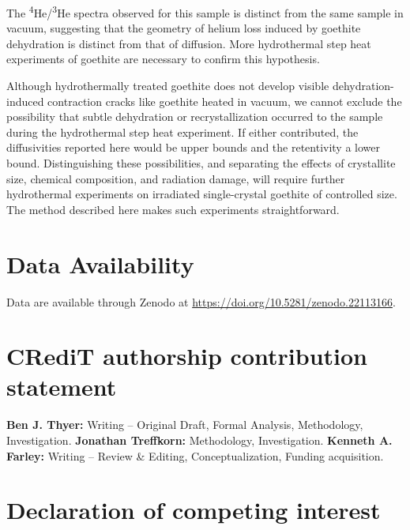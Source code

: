 The \textsuperscript{4}He/\textsuperscript{3}He spectra observed for this sample is distinct from the same sample in vacuum, suggesting that the geometry of helium loss induced by goethite dehydration is distinct from that of diffusion. More hydrothermal step heat experiments of goethite are necessary to confirm this hypothesis.

Although hydrothermally treated goethite does not develop visible dehydration-induced contraction cracks like goethite heated in vacuum, we cannot exclude the possibility that subtle dehydration or recrystallization occurred to the sample during the hydrothermal step heat experiment. If either contributed, the diffusivities reported here would be upper bounds and the retentivity a lower bound. Distinguishing these possibilities, and separating the effects of crystallite size, chemical composition, and radiation damage, will require further hydrothermal experiments on irradiated single-crystal goethite of controlled size. The method described here makes such experiments straightforward.

\section*{Data Availability}

Data are available through Zenodo at \url{https://doi.org/10.5281/zenodo.22113166}.

\section*{CRediT authorship contribution statement}

\textbf{Ben J. Thyer:} Writing -- Original Draft, Formal Analysis, Methodology, Investigation. \textbf{Jonathan Treffkorn:} Methodology, Investigation. \textbf{Kenneth A. Farley:} Writing -- Review \& Editing, Conceptualization, Funding acquisition.

\section*{Declaration of competing interest}

